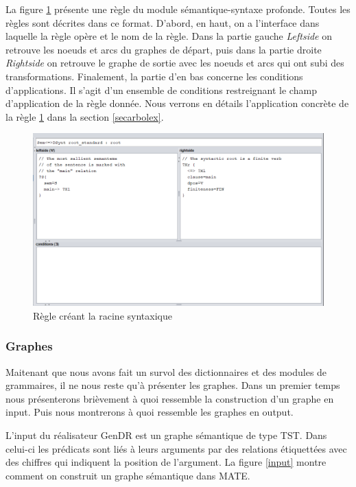 La figure \ref{fig:root} présente une règle du module sémantique-syntaxe profonde. Toutes les règles sont décrites dans ce format. D'abord, en haut, on a l'interface dans laquelle la règle opère et le nom de la règle. Dans la partie gauche \emph{Leftside} on retrouve les noeuds et arcs du graphes de départ, puis dans la partie droite \emph{Rightside} on retrouve le graphe de sortie avec les noeuds et arcs qui ont subi des transformations. Finalement, la partie d'en bas concerne les conditions d'applications. Il s'agit d'un ensemble de conditions restreignant le champ d'application de la règle donnée. Nous verrons en détails l'application concrète de la règle \ref{fig:root} dans la section \ref{secarbolex}.
\begin{figure}[htb]
	\centering
	\includegraphics[width=1\textwidth, trim = {0cm 0cm 0cm 0cm},clip]{ch3/figs/grammaire.png}
	\caption{Règle créant la racine syntaxique}
	\label{fig:root}
\end{figure}


\subsubsection{Graphes}\label{entree-sortie}
Maitenant que nous avons fait un survol des dictionnaires et des modules de grammaires, il ne nous reste qu'à présenter les graphes. Dans un premier temps nous présenterons brièvement à quoi ressemble la construction d'un graphe en input. Puis nous montrerons à quoi ressemble les graphes en output.

L'input du réalisateur GenDR est un graphe sémantique de type \acf{TST}. Dans celui-ci les prédicats sont liés à leurs arguments par des relations étiquettées avec des chiffres qui indiquent la position de l'argument. La figure \ref{input} montre comment on construit un graphe sémantique dans MATE.

